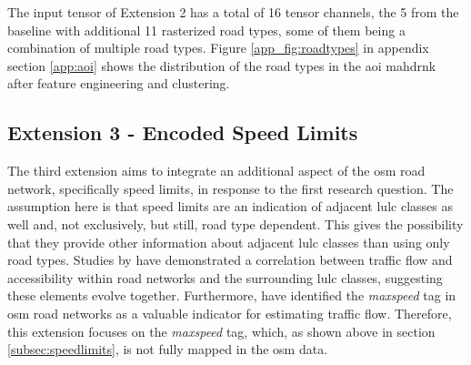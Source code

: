 The input tensor of Extension 2 has a total of 16 tensor channels, the 5 from the baseline with additional 11 rasterized road types, some of them being a combination of multiple road types. Figure \ref{app_fig:roadtypes} in appendix section \ref{app:aoi} shows the distribution of the road types in the \gls{aoi} \gls{mahdrnk} after feature engineering and clustering.

\subsection{Extension 3 - Encoded Speed Limits}
\label{sec:ext3}

The third extension aims to integrate an additional aspect of the \gls{osm} road network, specifically speed limits, in response to the first research question. The assumption here is that speed limits are an indication of adjacent \gls{lulc} classes as well and, not exclusively, but still, road type dependent. This gives the possibility that they provide other information about adjacent \gls{lulc} classes than using only road types. Studies by \textcite{Levinson.Xie.ea2007,Levinson.Yerra2005} have demonstrated a correlation between traffic flow and accessibility within road networks and the surrounding \gls{lulc} classes, suggesting these elements evolve together. Furthermore, \textcite{Zhao.Ning.ea2023} have identified the \emph{maxspeed} tag in \gls{osm} road networks as a valuable indicator for estimating traffic flow. Therefore, this extension focuses on the \emph{maxspeed} tag, which, as shown above in section \ref{subsec:speedlimits}, is not fully mapped in the \gls{osm} data.

